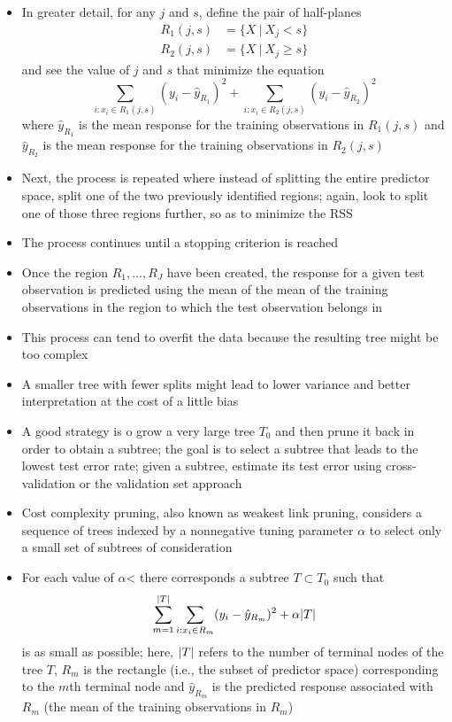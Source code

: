 \documentclass[12pt]{article}
\begin{document}
\begin{itemize}
\item In greater detail, for any $j$ and $s$, define the pair of half-planes $$ \begin{aligned} R_1(j,s) &= \{X~|~ X_j < s\} \\ R_2(j,s) &= \{X ~|~ X_j \geq s\} \end{aligned} $$ and see the value of $j$ and $s$ that minimize the equation $$  \sum_{i: x_i \in R_1(j,s)} (y_i - \hat{y}_{R_1})^2 + \sum_{i: x_i \in R_2(j,s)} (y_i - \hat{y}_{R_2})^2 $$ where $\hat{y}_{R_1}$ is the mean response for the training observations in $R_1(j,s)$ and $\hat{y}_{R_2}$ is the mean response for the training observations in $R_2(j,s)$ 
\item Next, the process is repeated where instead of splitting the entire predictor space, split one of the two previously identified regions; again, look to split one of those three regions further, so as to minimize the RSS
\item The process continues until a stopping criterion is reached 
\item Once the region $R_1,\dots,R_J$ have been created, the response for a given test observation is predicted using the mean of the mean of the training observations in the region to which the test observation belongs in 
\item This process can tend to overfit the data because the resulting tree might be too complex
\item A smaller tree with fewer splits might lead to lower variance and better interpretation at the cost of a little bias 
\item A good strategy is o grow a very large tree $T_0$ and then prune it back in order to obtain a subtree; the goal is to select a subtree that leads to the lowest test error rate; given a subtree, estimate its test error using cross-validation or the validation set approach
\item Cost complexity pruning, also known as weakest link pruning, considers a sequence of trees indexed by a nonnegative tuning parameter $\alpha$ to select only a small set of subtrees of consideration 
\item For each value of $\alpha$< there corresponds a subtree $T \subset T_0$ such that $$ \sum_{m=1}^{\abs{T}} \sum_{i: x_i \in R_m} (y_i - \hat{y}_{R_m})^2  + \alpha\abs{T}$$ is as small as possible; here, $\abs{T}$ refers to the number of terminal nodes of the tree $T$, $R_m$ is the rectangle (i.e., the subset of predictor space) corresponding to the $m$th terminal node and $\hat{y}_{R_m}$ is the predicted response associated with $R_m$ (the mean of the training observations in $R_m$)

\end{itemize}
\end{document}
